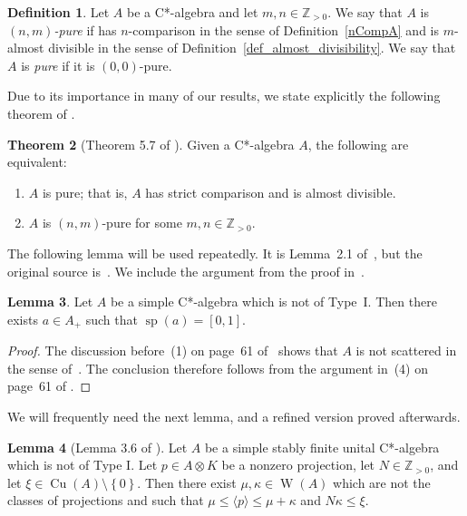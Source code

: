\documentclass[10pt]{amsart}
\numberwithin{equation}{section}
\theoremstyle{definition}
\newtheorem{thm}{Theorem}[section]
\newtheorem{lem}[thm]{Lemma}
\newtheorem{dfn}[thm]{Definition}
\newcommand{\kp}{\kappa}
\newcommand{\N}{{\mathbb{Z}}_{> 0}}
\newcommand{\spec}{{\operatorname{sp}}}
\newcommand{\Cu}{{\operatorname{Cu}}}
\newcommand{\W}{{\operatorname{W}}}
\newcommand{\ca}{C*-algebra}
\newcommand{\pj}{projection}
\newcommand{\set}[1]{\left\{ #1 \right\}}
\newcommand{\cc}[1]{\langle #1 \rangle}
\newcommand{\ten}{\otimes}
\begin{document}
\begin{dfn}\label{D_PureAlg}
Let $A$ be a C*-algebra and let $m,n \in \N$.
We say that
$A$ is \emph{$(n,m)$-pure} if has $n$-comparison in the
sense of Definition~\ref{nCompA} and is $m$-almost divisible
in the sense of Definition~\ref{def_almost_divisibility}.
We say that $A$ is \emph{pure} if it is $(0,0)$-pure.
\end{dfn}

Due to its importance in many of our results, we state explicitly
the following theorem of \cite{AnPrTlVt}.

\begin{thm}[Theorem 5.7 of \cite{AnPrTlVt}]\label{T_PureEquiv}
Given a C*-algebra $A$, the following are equivalent:
%
\begin{enumerate}
%
\item
$A$ is pure; that is, $A$ has strict comparison and is almost divisible.
%
\item
$A$ is $(n,m)$-pure for some $m,n \in \N$.
%
\end{enumerate}
%
\end{thm}

The following lemma will be used repeatedly.
It is Lemma~2.1 of~\cite{Phl40}, but the original source is~\cite{AkmnShlz}.
We include the argument from the proof in~\cite{Phl40}.

\begin{lem}\label{L_3618_Sp01}
Let $A$ be a simple \ca{} which is not of Type~I.
Then there exists $a \in A_{+}$ such that
$\spec (a) = [0, 1]$.
\end{lem}

\begin{proof}
The discussion before~(1) on page~61 of~\cite{AkmnShlz}
shows that $A$ is not scattered in the sense of~\cite{AkmnShlz}.
The conclusion therefore follows
from the argument in~(4) on page~61 of \cite{AkmnShlz}.
\end{proof}

We will frequently need the next lemma,
and a refined version proved afterwards.

\begin{lem}[Lemma 3.6 of \cite{Phl40}]\label{L_3618_Lg36}
Let $A$ be a simple stably finite unital C*-algebra which
is not of Type I.
Let $p \in A \ten K$ be a nonzero
projection, let $N \in \N$, and let $\xi \in \Cu (A) \setminus \set{0}$.
Then there exist $\mu, \kp \in \W (A)$ which are not the classes of \pj{s}
and such that $\mu \leq \cc{p} \leq \mu + \kp$ and $N \kp \leq \xi$.
\end{lem}
\end{document}

